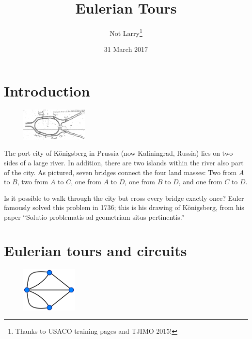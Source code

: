 \documentclass{article}
\title{Eulerian Tours}
\author{Not Larry\footnote{Thanks to USACO training pages and TJIMO 2015!}}
\date{31 March 2017}
\begin{document}
\maketitle

\section{Introduction}

\begin{figure}
  \vspace{-10pt}
  \begin{center}
    \includegraphics[width=0.3\textwidth]{bridges.png}
  \end{center}
  \vspace{0pt}
\end{figure}


The port city of K\"{o}nigsberg in Prussia (now Kaliningrad, Russia) lies on two sides of a large river. In addition, there are two islands within the river also part of the city. As pictured, seven bridges connect the four land masses: Two from $A$ to $B$, two from $A$ to $C$, one from $A$ to $D$, one from $B$ to $D$, and one from $C$ to $D$.

Is it possible to walk through the city but cross every bridge exactly once? Euler famously solved this problem in 1736; this is his drawing of K\"{o}nigsberg, from his paper ``Solutio problematis ad geometriam situs pertinentis.''


\section{Eulerian tours and circuits}

\begin{figure}
  \vspace{-40pt}
  \begin{center}
    \includegraphics[width=0.25\textwidth]{Konigsberg_graph.png}
  \end{center}
  \vspace{0pt}
\end{figure}
\end{document}
